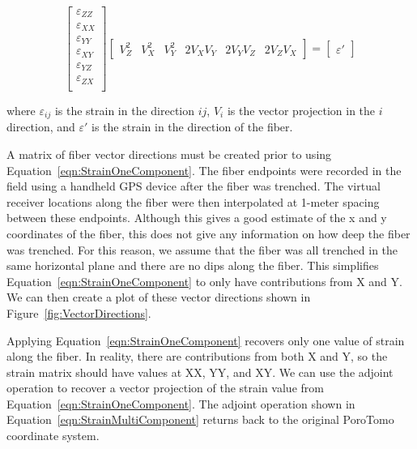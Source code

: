 \begin{equation}
\begin{bmatrix}
  \varepsilon_{ZZ} \\
  \varepsilon_{XX} \\
  \varepsilon_{YY} \\
  \varepsilon_{XY} \\
  \varepsilon_{YZ} \\
  \varepsilon_{ZX} \\
\end{bmatrix}
\begin{bmatrix}
  V_Z^2 & V_X^2 & V_Y^2 & 2V_XV_Y & 2V_YV_Z & 2V_ZV_X
\end{bmatrix}
=
\begin{bmatrix}
  \varepsilon'
\end{bmatrix}
\label{eqn:StrainOneComponent}
\end{equation}

where $\varepsilon_{ij}$ is the strain in the direction $ij$, $V_{i}$ is the vector projection in the $i$ direction, and $\varepsilon'$ is the strain in the direction of the fiber.

A matrix of fiber vector directions must be created prior to using Equation~\ref{eqn:StrainOneComponent}. The fiber endpoints were recorded in the field using a handheld GPS device after the fiber was trenched. The virtual receiver locations along the fiber were then interpolated at 1-meter spacing between these endpoints. Although this gives a good estimate of the x and y coordinates of the fiber, this does not give any information on how deep the fiber was trenched. For this reason, we assume that the fiber was all trenched in the same horizontal plane and there are no dips along the fiber. This simplifies Equation~\ref{eqn:StrainOneComponent} to only have contributions from X and Y. We can then create a plot of these vector directions shown in Figure~\ref{fig:VectorDirections}.


Applying Equation~\ref{eqn:StrainOneComponent} recovers only one value of strain along the fiber. In reality, there are contributions from both X and Y, so the strain matrix should have values at XX, YY, and XY. We can use the adjoint operation to recover a vector projection of the strain value from Equation~\ref{eqn:StrainOneComponent}. The adjoint operation shown in Equation~\ref{eqn:StrainMultiComponent} returns back to the original PoroTomo coordinate system.

